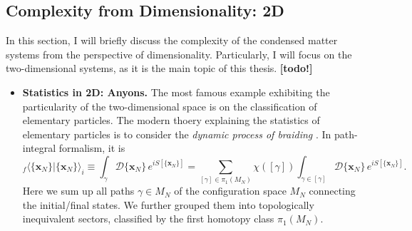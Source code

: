     \subsection{Complexity from Dimensionality: 2D}
        In this section, I will briefly discuss the complexity of the condensed matter systems from the perspective of dimensionality. Particularly, I will focus on the two-dimensional systems, as it is the main topic of this thesis. \textbf{[todo!]}
        \begin{itemize}
            \item \textbf{Statistics in 2D: Anyons.} The most famous example exhibiting the particularity of the two-dimensional space is on the classification of elementary particles. The modern thoery explaining the statistics of elementary particles is to consider the \emph{dynamic process of braiding} \cite{laidlaw1971feynman}\cite{wu1984general}. In path-integral formalism, it is 
            \begin{equation*}
                _f\langle \{\bm x_N\}|\{\bm x_N\}\rangle_i\equiv\int_{\gamma}\mathcal D\{\bm x_N\}\, e^{iS[\{\bm x_N\}]}=\sum_{[\gamma]\in\pi_1(M_N)}\chi([\gamma])\int_{\gamma\in[\gamma]}\mathcal D\{\bm x_N\}\, e^{iS[\{\bm x_N\}]}.
            \end{equation*}
            Here we sum up all paths $\gamma\in M_N$ of the conﬁguration space $M_N$ connecting the initial/ﬁnal states. We further grouped them into topologically inequivalent sectors, classiﬁed by the ﬁrst homotopy class $\pi_1(M_N)$. 


\end{itemize}
